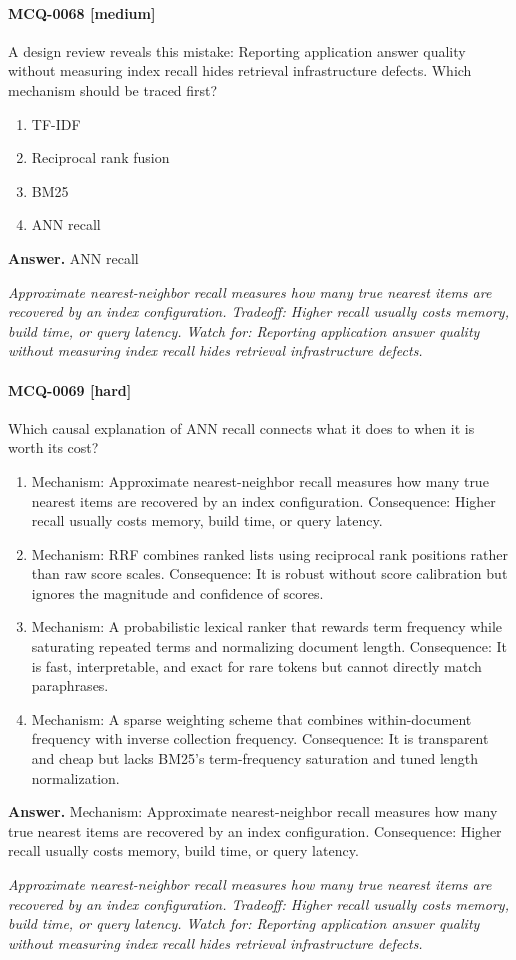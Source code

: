 \paragraph{MCQ-0068 [medium]} A design review reveals this mistake: Reporting application answer quality without measuring index recall hides retrieval infrastructure defects. Which mechanism should be traced first?
\begin{enumerate}[label=\Alph*.]
\item TF-IDF
\item Reciprocal rank fusion
\item BM25
\item ANN recall
\end{enumerate}
\noindent\textbf{Answer.} ANN recall
\par\textit{Approximate nearest-neighbor recall measures how many true nearest items are recovered by an index configuration. Tradeoff: Higher recall usually costs memory, build time, or query latency. Watch for: Reporting application answer quality without measuring index recall hides retrieval infrastructure defects.}
\paragraph{MCQ-0069 [hard]} Which causal explanation of ANN recall connects what it does to when it is worth its cost?
\begin{enumerate}[label=\Alph*.]
\item Mechanism: Approximate nearest-neighbor recall measures how many true nearest items are recovered by an index configuration. Consequence: Higher recall usually costs memory, build time, or query latency.
\item Mechanism: RRF combines ranked lists using reciprocal rank positions rather than raw score scales. Consequence: It is robust without score calibration but ignores the magnitude and confidence of scores.
\item Mechanism: A probabilistic lexical ranker that rewards term frequency while saturating repeated terms and normalizing document length. Consequence: It is fast, interpretable, and exact for rare tokens but cannot directly match paraphrases.
\item Mechanism: A sparse weighting scheme that combines within-document frequency with inverse collection frequency. Consequence: It is transparent and cheap but lacks BM25's term-frequency saturation and tuned length normalization.
\end{enumerate}
\noindent\textbf{Answer.} Mechanism: Approximate nearest-neighbor recall measures how many true nearest items are recovered by an index configuration. Consequence: Higher recall usually costs memory, build time, or query latency.
\par\textit{Approximate nearest-neighbor recall measures how many true nearest items are recovered by an index configuration. Tradeoff: Higher recall usually costs memory, build time, or query latency. Watch for: Reporting application answer quality without measuring index recall hides retrieval infrastructure defects.}
